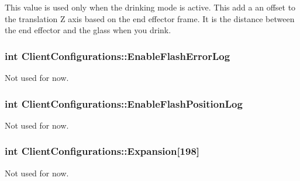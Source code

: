 This value is used only when the drinking mode is active. This add a an offset to the translation Z axis based on the end effector frame. It is the distance between the end effector and the glass when you drink. 

\subsubsection[{\texorpdfstring{Enable\+Flash\+Error\+Log}{EnableFlashErrorLog}}]{\setlength{\rightskip}{0pt plus 5cm}int Client\+Configurations\+::\+Enable\+Flash\+Error\+Log}\hypertarget{struct_client_configurations_a16b087061d560a4f185e779352d6e2e3}{}\label{struct_client_configurations_a16b087061d560a4f185e779352d6e2e3}


Not used for now. 

\subsubsection[{\texorpdfstring{Enable\+Flash\+Position\+Log}{EnableFlashPositionLog}}]{\setlength{\rightskip}{0pt plus 5cm}int Client\+Configurations\+::\+Enable\+Flash\+Position\+Log}\hypertarget{struct_client_configurations_ae0c7b4d0a3f91271e8138985807be8c6}{}\label{struct_client_configurations_ae0c7b4d0a3f91271e8138985807be8c6}


Not used for now. 

\subsubsection[{\texorpdfstring{Expansion}{Expansion}}]{\setlength{\rightskip}{0pt plus 5cm}int Client\+Configurations\+::\+Expansion\mbox{[}198\mbox{]}}\hypertarget{struct_client_configurations_a2d47352837bfafcb6f4e6bddcf3e0278}{}\label{struct_client_configurations_a2d47352837bfafcb6f4e6bddcf3e0278}


Not used for now. 


